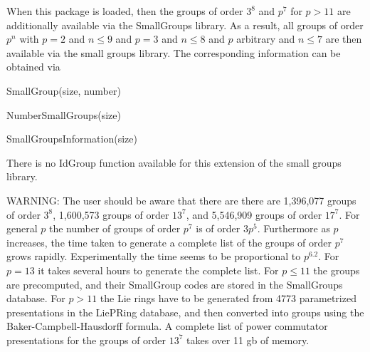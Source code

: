 

When this package is loaded, then the groups of order $3^8$ and $p^7$ for 
$p > 11$ are additionally available via the SmallGroups library. As a result,
all groups of order $p^n$ with $p=2$ and $n \leq 9$ and $p=3$ and $n \leq 8$
and $p$ arbitrary and $n \leq 7$ are then available via the small groups
library. The corresponding information can be obtained via 

\>SmallGroup(size, number)

\>NumberSmallGroups(size)

\>SmallGroupsInformation(size)

There is no IdGroup function available for this extension of the small
groups library.

WARNING: The user should be aware that there are there are 1,396,077 groups
of order $3^8$, 1,600,573 groups of order $13^{7}$, and 5,546,909 groups
of order $17^7$. For general $p$ the number of groups of order $p^7$ is 
of order $3p^5$. Furthermore as $p$ increases, the time taken to
generate a complete list of the groups of order $p^7$ grows rapidly.
Experimentally the time seems to be proportional to $p^{6.2}$. 
For $p=13$ it
takes several hours to generate the complete list. For $p\leq 11$ the
groups are precomputed, and their SmallGroup codes are stored in the
SmallGroups database. For $p>11$ the Lie rings have to be generated from
4773 parametrized presentations in the LiePRing database, and then converted
into groups using the Baker-Campbell-Hausdorff formula. A complete list of 
power commutator presentations for the groups of order $13^7$ takes over 
11 gb of memory.

